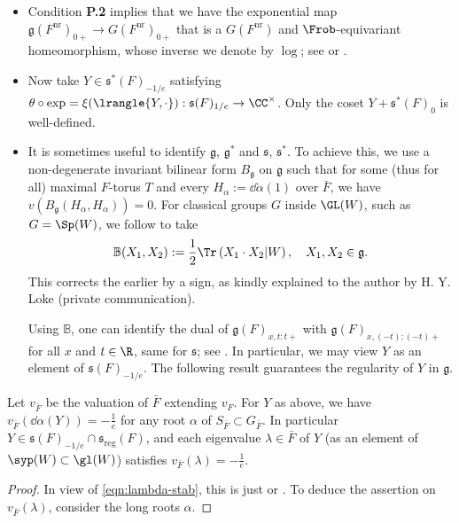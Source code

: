 \documentclass[a4paper,10pt]{article}
\begin{document}
\begin{itemize}
	\item Condition \textbf{P.2} implies that we have the exponential map $\mathfrak{g}(F^\text{nr})_{0+} \to G(F^\text{nr})_{0+}$ that is a $G(F^\text{nr})$ and $\Frob$-equivariant homeomorphism, whose inverse we denote by $\log$; see \cite[p.57]{Kal13} or \cite[Appendix B]{DR09}.
	\item Now take $Y \in \mathfrak{s}^*(F)_{-1/e}$ satisfying $\theta \circ \exp = \xi(\lrangle{Y, \cdot}): \mathfrak{s}(F)_{1/e} \to \CC^\times$. Only the coset $Y + \mathfrak{s}^*(F)_0$ is well-defined.
	\item It is sometimes useful to identify $\mathfrak{g}$, $\mathfrak{g}^*$ and $\mathfrak{s}$, $\mathfrak{s}^*$. To achieve this, we use a non-degenerate invariant bilinear form $B_{\mathfrak{g}}$ on $\mathfrak{g}$ such that for some (thus for all) maximal $F$-torus $T$ and every $H_\alpha := \dd\check{\alpha}(1)$ over $\bar{F}$, we have $v\left( B_{\mathfrak{g}}(H_\alpha, H_\alpha)\right) = 0$. For classical groups $G$ inside $\GL(W)$, such as $G = \Sp(W)$, we follow \cite[\S 2.1.1]{LM} to take
	\begin{equation}\label{eqn:B_g-LMS}
		\mathbb{B}(X_1, X_2) := \frac{1}{2} \Tr\left( X_1 \cdot X_2 | W \right), \quad X_1, X_2 \in \mathfrak{g}.
	\end{equation} 
	This corrects the earlier \cite[Definition 6.1.1]{LMS16} by a sign, as kindly explained to the author by H.\! Y.\! Loke (private communication).

	Using $\mathbb{B}$, one can identify the dual of $\mathfrak{g}(F)_{x, t:t+}$ with $\mathfrak{g}(F)_{x, (-t):(-t)+}$ for all $x$ and $t \in \R$, same for $\mathfrak{s}$; see \cite[Lemma A.1.1]{DR09}. In particular, we may view $Y$ as an element of $\mathfrak{s}(F)_{-1/e}$. The following result guarantees the regularity of $Y$ in $\mathfrak{g}$.
\end{itemize}

\begin{proposition}\label{prop:stable-good}
	Let $v_{\bar{F}}$ be the valuation of $\bar{F}$ extending $v_F$. For $Y$ as above, we have $v_{\bar{F}}(\dd\alpha(Y)) = -\frac{1}{e}$ for any root $\alpha$ of $S_{\bar{F}} \subset G_{\bar{F}}$. In particular $Y \in \mathfrak{s}(F)_{-1/e} \cap \mathfrak{s}_{\mathrm{reg}}(F)$, and each eigenvalue $\lambda \in \bar{F}$ of $Y$ (as an element of $\syp(W) \subset \gl(W)$) satisfies $v_{\bar{F}}(\lambda) = -\frac{1}{e}$.
\end{proposition}
\begin{proof}
	In view of \eqref{eqn:lambda-stab}, this is just \cite[Lemma 7.3.1]{LMS16} or \cite[Lemma 3.2]{Kal15}. To deduce the assertion on $v_{\bar{F}}(\lambda)$, consider the long roots $\alpha$.
\end{proof}
\end{document}
